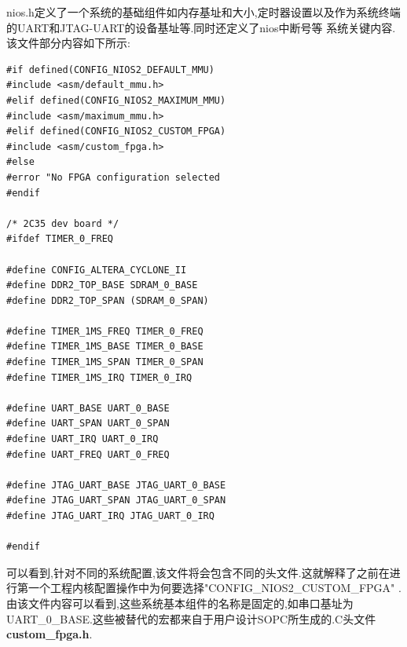 \documentclass[12pt,a4paper,titlepage]{article}
\begin{document}
nios.h定义了一个系统的基础组件如内存基址和大小,定时器设置以及作为系统终端的UART和JTAG-UART的设备基址等.同时还定义了nios中断号等
系统关键内容.该文件部分内容如下所示:
\begin{verbatim}
#if defined(CONFIG_NIOS2_DEFAULT_MMU)
#include <asm/default_mmu.h>
#elif defined(CONFIG_NIOS2_MAXIMUM_MMU)
#include <asm/maximum_mmu.h>
#elif defined(CONFIG_NIOS2_CUSTOM_FPGA)
#include <asm/custom_fpga.h>
#else
#error "No FPGA configuration selected
#endif

/* 2C35 dev board */
#ifdef TIMER_0_FREQ

#define CONFIG_ALTERA_CYCLONE_II
#define DDR2_TOP_BASE SDRAM_0_BASE
#define DDR2_TOP_SPAN (SDRAM_0_SPAN)

#define TIMER_1MS_FREQ TIMER_0_FREQ
#define TIMER_1MS_BASE TIMER_0_BASE
#define TIMER_1MS_SPAN TIMER_0_SPAN
#define TIMER_1MS_IRQ TIMER_0_IRQ

#define UART_BASE UART_0_BASE
#define UART_SPAN UART_0_SPAN
#define UART_IRQ UART_0_IRQ
#define UART_FREQ UART_0_FREQ

#define JTAG_UART_BASE JTAG_UART_0_BASE
#define JTAG_UART_SPAN JTAG_UART_0_SPAN
#define JTAG_UART_IRQ JTAG_UART_0_IRQ

#endif
\end{verbatim}
可以看到,针对不同的系统配置,该文件将会包含不同的头文件.这就解释了之前在进行第一个工程内核配置操作中为何要选择"CONFIG\_NIOS2\_CUSTOM\_FPGA"
.由该文件内容可以看到,这些系统基本组件的名称是固定的,如串口基址为UART\_0\_BASE.这些被替代的宏都来自于用户设计SOPC所生成的.C头文件
\textbf{custom\_fpga.h}.
\end{document}
